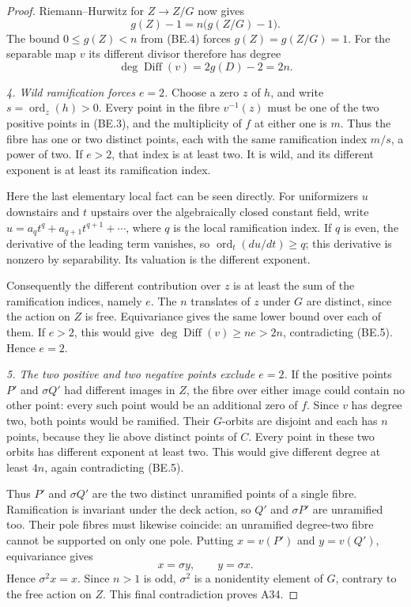 \documentclass[11pt,a4paper]{article}
\begin{document}
\begin{proof}
Riemann--Hurwitz for $Z\to Z/G$ now gives
\[
                       g(Z)-1=n\bigl(g(Z/G)-1\bigr).
\]
The bound $0\le g(Z)<n$ from (BE.4) forces
$g(Z)=g(Z/G)=1$.
For the separable map $v$ its different divisor therefore has
degree
\[
                    \deg\operatorname{Diff}(v)=2g(D)-2=2n.
 \tag{BE.5}
\]

\emph{4. Wild ramification forces $e=2$.}
Choose a zero $z$ of $h$, and write $s=\operatorname{ord}_z(h)>0$.
Every point in the fibre $v^{-1}(z)$ must be one of the two
positive points in (BE.3), and the multiplicity of $f$ at either
one is $m$. Thus the fibre has one or two distinct points,
each with the same ramification index $m/s$, a power of two.
If $e>2$, that index is at least two. It is wild, and its
different exponent is at least its ramification index.

Here the last elementary local fact can be seen directly.
For uniformizers $u$ downstairs and $t$ upstairs over the
algebraically closed constant field, write
$u=a_qt^q+a_{q+1}t^{q+1}+\cdots$, where $q$ is the local
ramification index. If $q$ is even, the derivative of the
leading term vanishes, so
$\operatorname{ord}_t(du/dt)\ge q$; this derivative is nonzero
by separability. Its valuation is the different exponent.

Consequently the different contribution over $z$ is at least
the sum of the ramification indices, namely $e$.
The $n$ translates of $z$ under $G$ are distinct, since the
action on $Z$ is free. Equivariance gives the same lower bound
over each of them. If $e>2$, this would give
$\deg\operatorname{Diff}(v)\ge ne>2n$, contradicting (BE.5).
Hence $e=2$.

\emph{5. The two positive and two negative points exclude $e=2$.}
If the positive points $P'$ and $\sigma Q'$ had different
images in $Z$, the fibre over either image could contain
no other point: every such point would be an additional
zero of $f$. Since $v$ has degree two, both points would
be ramified. Their $G$-orbits are disjoint and each has $n$
points, because they lie above distinct points of $C$.
Every point in these two orbits has different exponent at
least two. This would give different degree at least $4n$,
again contradicting (BE.5).

Thus $P'$ and $\sigma Q'$ are the two distinct unramified
points of a single fibre. Ramification is invariant under
the deck action, so $Q'$ and $\sigma P'$ are unramified too.
Their pole fibres must likewise coincide: an unramified
degree-two fibre cannot be supported on only one pole.
Putting $x=v(P')$ and $y=v(Q')$, equivariance gives
\[
                         x=\sigma y,\qquad y=\sigma x.
 \tag{BE.6}
\]
Hence $\sigma^2x=x$. Since $n>1$ is odd, $\sigma^2$ is a
nonidentity element of $G$, contrary to the free action on
$Z$. This final contradiction proves A34.
\end{proof}
\end{document}
